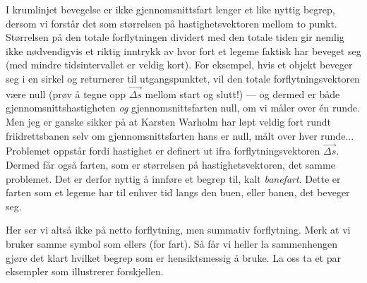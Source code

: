 I krumlinjet bevegelse er ikke gjennomsnittsfart lenger et like nyttig begrep, dersom vi forstår det som størrelsen på hastighetsvektoren mellom to punkt. Størrelsen på den totale forflytningen dividert med den totale tiden gir nemlig ikke nødvendigvis et riktig inntrykk av hvor fort et legeme faktisk har beveget seg (med mindre tidsintervallet er veldig kort). For eksempel, hvis et objekt beveger seg i en sirkel og returnerer til utgangspunktet, vil den totale forflytningsvektoren være null (prøv å tegne opp $\vec{\Delta s}$ mellom start og slutt!) --- og dermed er både gjennomsnittshastigheten \emph{og} gjennomsnittsfarten null, om vi måler over én runde. Men jeg er ganske sikker på at Karsten Warholm har løpt veldig fort rundt friidrettsbanen selv om gjennomsnittsfarten hans er null, målt over hver runde... Problemet oppstår fordi hastighet er definert ut ifra forflytningsvektoren $\vec{\Delta s}$. Dermed får også farten, som er størrelsen på hastighetsvektoren, det samme problemet. Det er derfor nyttig å innføre et begrep til, kalt \textit{banefart}. Dette er farten som et legeme har til enhver tid langs den buen, eller banen, det beveger seg. 

Her ser vi altså ikke på netto forflytning, men summativ forflytning. Merk at vi bruker samme symbol som ellers (for fart). Så får vi heller la sammenhengen gjøre det klart hvilket begrep som er hensiktsmessig å bruke. La oss ta et par eksempler som illustrerer forskjellen.


